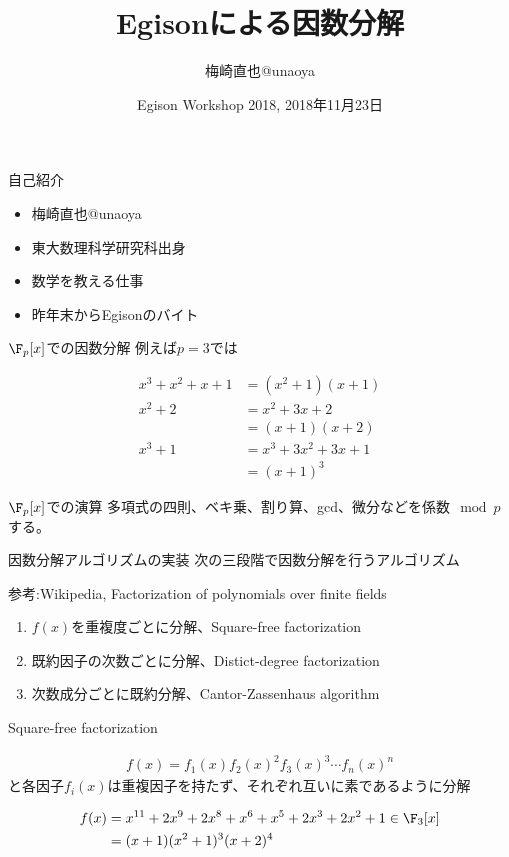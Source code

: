 \documentclass{beamer}
\title{Egisonによる因数分解}
\author{梅崎直也@unaoya}
\date{Egison Workshop 2018, 2018年11月23日}
\institute{株式会社すうがくぶんか}
\begin{document}
\begin{frame}
\maketitle
\end{frame}

\begin{frame}{自己紹介}
\begin{itemize}
\item 梅崎直也@unaoya
\item 東大数理科学研究科出身
\item 数学を教える仕事
\item 昨年末からEgisonのバイト
\end{itemize}
\end{frame} 

\begin{frame}{$\F_p[x]$での因数分解}
例えば$p=3$では

\begin{align*}
x^3+x^2+x+1&=(x^2+1)(x+1)\\
x^2+2&=x^2+3x+2\\&=(x+1)(x+2)\\
x^3+1&=x^3+3x^2+3x+1\\&=(x+1)^3
\end{align*}
\end{frame}

\begin{frame}{$\F_p[x]$での演算}
多項式の四則、ベキ乗、割り算、gcd、微分などを係数$\mod p$する。
\end{frame}

\begin{frame}{因数分解アルゴリズムの実装}
次の三段階で因数分解を行うアルゴリズム

参考:Wikipedia, Factorization of polynomials over finite fields

\begin{enumerate}
\item $f(x)$を重複度ごとに分解、Square-free factorization
\item 既約因子の次数ごとに分解、Distict-degree factorization
\item 次数成分ごとに既約分解、Cantor-Zassenhaus algorithm
\end{enumerate}
\end{frame}

\begin{frame}{Square-free factorization}

\begin{align*}
f(x)=f_1(x)f_2(x)^2f_3(x)^3\cdots f_n(x)^n
\end{align*}
と各因子$f_i(x)$は重複因子を持たず、それぞれ互いに素であるように分解


\begin{align*}
f(x)&=x^{11}+2x^9+2x^8+x^6+x^5+2x^3+2x^2+1 \in \F_3[x]\\
&=(x+1)(x^2+1)^3(x+2)^4
\end{align*}
\end{frame}
\end{document}

